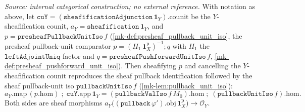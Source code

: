 \begin{lemma}\label{mk-lem:presheaf_pullback_unit_iso_sheafify_reconcile}
  \leanok

  \textit{Source: internal categorical construction; no external reference.}
  With notation as above, let \(\mathtt{cuY} = (\mathtt{sheafificationAdjunction}\,\mathbf 1_Y).\mathrm{counit}\)
  be the $Y$-sheafification counit, \(a_Y = \mathtt{sheafification}\,\mathbf 1_Y\), and
  \(p = \mathtt{presheafPullbackUnitIso}\,f\) (\ref{mk-def:presheaf_pullback_unit_iso}, the presheaf
  pullback-unit comparator \(p = (H_1\,\mathbf 1^{\mathrm p}_X)^{-1} \mathbin{;} q\) with \(H_1\) the
  \(\mathtt{leftAdjointUniq}\) factor and \(q = \mathtt{presheafPushforwardUnitIso}\,f\),
  \ref{mk-def:presheaf_pushforward_unit_iso}). Then sheafifying \(p\) and cancelling the
  $Y$-sheafification counit reproduces the sheaf pullback identification followed by the sheaf
  pullback-unit iso \(\mathtt{pullbackUnitIso}\,f\) (\ref{mk-lem:pullback_unit_iso}):
  \[
    a_Y.\mathrm{map}\,(p.\mathrm{hom}) \;\mathbin{;}\; \mathtt{cuY}.\mathrm{app}\,\mathbf 1_Y
      = (\mathtt{pullbackValIso}\,f\,M_0).\mathrm{hom}
        \;\mathbin{;}\; (\mathtt{pullbackUnitIso}\,f).\mathrm{hom}.
  \]
  Both sides are sheaf morphisms
  \(a_Y\bigl((\mathtt{pullback}\,\varphi').\mathrm{obj}\,\mathbf 1^{\mathrm p}_X\bigr) \to \mathcal O_Y\).
\end{lemma}
